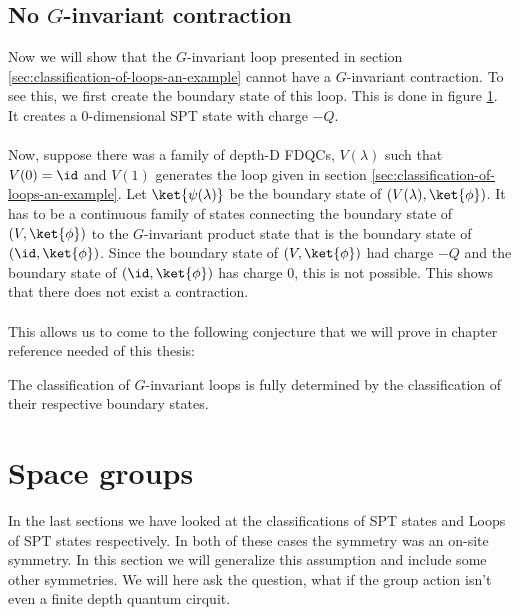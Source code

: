 \subsection{No $G$-invariant contraction}
\begin{figure}
	\centering
	\scalebox{0.8}{
	
	}
	\caption{}
	\label{fig:U1_ThoulessPumpAs_FiniteDepthQuantumCircuit_Boundary}
\end{figure}
Now we will show that the $G$-invariant loop presented in section \ref{sec:classification-of-loops-an-example} cannot have a $G$-invariant contraction. To see this, we first create the boundary state of this loop. This is done in figure \ref{fig:U1_ThoulessPumpAs_FiniteDepthQuantumCircuit_Boundary}. It creates a 0-dimensional SPT state with charge $-Q$.\\\\
Now, suppose there was a family of depth-D FDQCs, $V(\lambda)$ such that $V(0)=\id$ and $V(1)$ generates the loop given in section \ref{sec:classification-of-loops-an-example}. Let $\ket{\psi(\lambda)}$ be the boundary state of $(V(\lambda),\ket{\phi})$. It has to be a continuous family of states connecting the boundary state of $(V,\ket{\phi})$ to the $G$-invariant product state that is the boundary state of $(\id,\ket{\phi})$. Since the boundary state of $(V,\ket{\phi})$ had charge $-Q$ and the boundary state of $(\id,\ket{\phi})$ has charge $0$, this is not possible. This shows that there does not exist a contraction.\\\\
This allows us to come to the following conjecture that we will prove in chapter {\color{red}reference needed} of this thesis:
\begin{conjecture}
	The classification of $G$-invariant loops is fully determined by the classification of their respective boundary states.
\end{conjecture}
\section{Space groups}
In the last sections we have looked at the classifications of SPT states and Loops of SPT states respectively. In both of these cases the symmetry was an on-site symmetry. In this section we will generalize this assumption and include some other symmetries. We will here ask the question, what if the group action isn't even a finite depth quantum cirquit.
